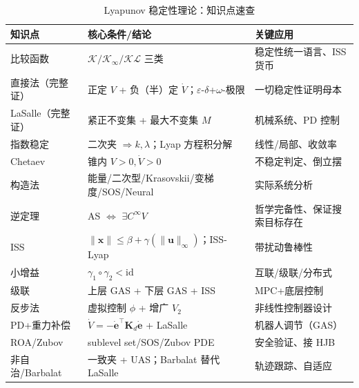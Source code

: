 \begin{table}[H]\centering\small
\caption{Lyapunov 稳定性理论：知识点速查}
\label{tab:lyap-summary}
\begin{tabular}{lll}
\toprule
知识点 & 核心条件/结论 & 关键应用 \\
\midrule
比较函数 & $\mathcal{K}/\mathcal{K}_\infty/\mathcal{KL}$ 三类 & 稳定性统一语言、ISS 货币 \\
直接法（完整证） & 正定 $V$ + 负（半）定 $\dot V$；$\varepsilon$-$\delta$+$\omega$-极限 & 一切稳定性证明母本 \\
LaSalle（完整证） & 紧正不变集 + 最大不变集 $M$ & 机械系统、PD 控制 \\
指数稳定 & 二次夹 $\Rightarrow k,\lambda$；Lyap 方程积分解 & 线性/局部、收敛率 \\
Chetaev & 锥内 $V>0,\dot V>0$ & 不稳定判定、倒立摆 \\
构造法 & 能量/二次型/Krasovskii/变梯度/SOS/Neural & 实际系统分析 \\
逆定理 & AS $\Leftrightarrow$ $\exists C^\infty V$ & 哲学完备性、保证搜索目标存在 \\
ISS & $\|\mathbf{x}\|\le\beta+\gamma(\|\mathbf{u}\|_\infty)$；ISS-Lyap & 带扰动鲁棒性 \\
小增益 & $\gamma_1\circ\gamma_2<\mathrm{id}$ & 互联/级联/分布式 \\
级联 & 上层 GAS + 下层 GAS + ISS & MPC+底层控制 \\
反步法 & 虚拟控制 $\phi$ + 增广 $V_2$ & 非线性控制器设计 \\
PD+重力补偿 & $\dot V=-\dot{\mathbf{e}}^\top\mathbf{K}_d\dot{\mathbf{e}}$ + LaSalle & 机器人调节（GAS） \\
ROA/Zubov & sublevel set/SOS/Zubov PDE & 安全验证、接 HJB \\
非自治/Barbalat & 一致夹 + UAS；Barbalat 替代 LaSalle & 轨迹跟踪、自适应 \\
\bottomrule
\end{tabular}
\end{table}

